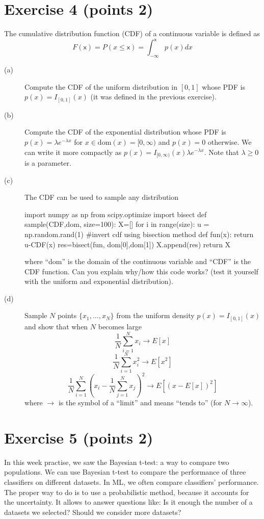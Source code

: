 \documentclass[a4paper,10pt]{article}
\begin{document}
\section*{Exercise 4 (points 2)}
The cumulative distribution function (CDF) of a continuous variable is
defined as
$$
F(\textsf{x})=P(x\leq \textsf{x})=\int_{-\infty}^{\textsf{x}} p(x)dx
$$
\begin{description}
 \item[(a)] Compute  the CDF of the uniform distribution in $[0,1]$
 whose PDF is $p(x)=I_{[0,1]}(x)$ (it was defined in the previous exercise).
 \item[(b)] Compute the CDF of the exponential distribution whose PDF is $p(x)=	\lambda e^{-\lambda x}$ for $x \in \text{dom}(x)=[0,\infty)$ and $p(x)=0$ otherwise. We can write it more compactly as
 $p(x)=I_{[0,\infty)}(x) \lambda e^{-\lambda x}$. Note that $\lambda\geq0$ is a parameter.
 \item[(c)]The CDF can be used to sample any distribution
 \begin{python}
import numpy as np
from scipy.optimize import bisect
def sample(CDF,dom, size=100):
    X=[]
    for i in range(size):
        u = np.random.rand(1)
        #invert cdf using bisection method
        def fun(x):
            return u-CDF(x)
        res=bisect(fun, dom[0],dom[1])
        X.append(res)
    return X
\end{python}
where ``dom'' is the domain of the continuous variable and ``CDF''
is the CDF function. Can you explain why/how this code works? (test it yourself
with the uniform and exponential distribution).
\item[(d)] Sample $N$ points $\{x_1,\dots,x_N\}$ from the uniform density $p(x)=I_{[0,1]}(x)$ and show that when $N$ becomes large
$$
\frac{1}{N} \sum_{i=1}^N x_i \rightarrow E[x]
$$
$$
\frac{1}{N} \sum_{i=1}^N x_i^2 \rightarrow E[x^2]
$$
$$
\frac{1}{N} \sum_{i=1}^N \left(x_i -\frac{1}{N} \sum_{j=1}^N x_j  \right)^2 \rightarrow E[(x-E[x])^2]
$$
where $\rightarrow$ is the symbol of a ``limit'' and means ``tends to''
(for $N \rightarrow \infty$).
\end{description}


\section*{Exercise 5 (points 2)}
In this week practise,  we saw the Bayesian t-test:  a way to compare two populations.
We can use Bayesian t-test to compare the performance of three classifiers on different datasets. In ML, we often compare classifiers' performance. The proper way to do is to use a probabilistic method, because it accounts for the uncertainty.
It allows to answer questions like: Is it enough the number of a datasets we selected? Should we consider more datasets?
\end{document}
